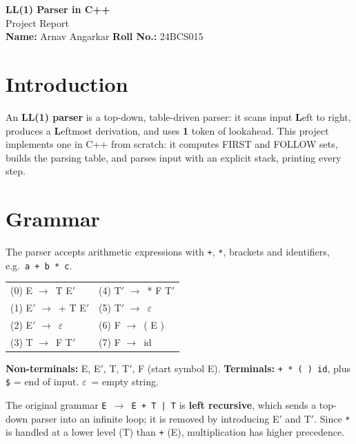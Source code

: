 \documentclass[10pt,a4paper]{article}
\newcommand{\eps}{$\varepsilon$}
\newcommand{\ar}{$\rightarrow$}
\newcommand{\tk}[1]{\texttt{#1}}
\begin{document}
\begin{center}
{\LARGE\bfseries LL(1) Parser in C++}\\[3pt]
{\large Project Report}\\[3pt]
\textbf{Name:} Arnav Angarkar \qquad \textbf{Roll No.:} 24BCS015
\end{center}

\section{Introduction}
An \textbf{LL(1) parser} is a top-down, table-driven parser: it scans input \textbf{L}eft to right,
produces a \textbf{L}eftmost derivation, and uses \textbf{1} token of lookahead.
This project implements one in C++ from scratch: it computes FIRST and FOLLOW sets, builds the
parsing table, and parses input with an explicit stack, printing every step.

\section{Grammar}
The parser accepts arithmetic expressions with \tk{+}, \tk{*}, brackets and identifiers, e.g.\ \tk{a + b * c}.

\begin{center}
\begin{tabular}{@{}l@{\hspace{2.5cm}}l@{}}
(0) E \ar\ T E$'$ & (4) T$'$ \ar\ * F T$'$ \\
(1) E$'$ \ar\ + T E$'$ & (5) T$'$ \ar\ \eps \\
(2) E$'$ \ar\ \eps & (6) F \ar\ ( E ) \\
(3) T \ar\ F T$'$ & (7) F \ar\ id \\
\end{tabular}
\end{center}

\textbf{Non-terminals:} E, E$'$, T, T$'$, F (start symbol E). \quad
\textbf{Terminals:} \tk{+ * ( ) id}, plus \tk{\$} = end of input. \quad \eps\ = empty string.

The original grammar \tk{E \ar\ E + T | T} is \textbf{left recursive}, which sends a top-down parser into an
infinite loop; it is removed by introducing E$'$ and T$'$. Since \tk{*} is handled at a lower level (T) than
\tk{+} (E), multiplication has higher precedence.
\end{document}
